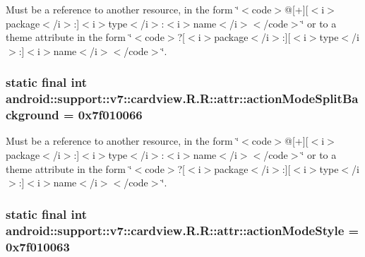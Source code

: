 Must be a reference to another resource, in the form \char`\"{}$<$code$>$@\mbox{[}+\mbox{]}\mbox{[}$<$i$>$package$<$/i$>$:\mbox{]}$<$i$>$type$<$/i$>$:$<$i$>$name$<$/i$>$$<$/code$>$\char`\"{} or to a theme attribute in the form \char`\"{}$<$code$>$?\mbox{[}$<$i$>$package$<$/i$>$:\mbox{]}\mbox{[}$<$i$>$type$<$/i$>$:\mbox{]}$<$i$>$name$<$/i$>$$<$/code$>$\char`\"{}. \hypertarget{classandroid_1_1support_1_1v7_1_1cardview_1_1_r_1_1attr_aa78e36ac55f75cf0a026cfb3b95a94f}{
\subsubsection[{actionModeSplitBackground}]{\setlength{\rightskip}{0pt plus 5cm}static final int android::support::v7::cardview.R.R::attr::actionModeSplitBackground = 0x7f010066}}
\label{classandroid_1_1support_1_1v7_1_1cardview_1_1_r_1_1attr_aa78e36ac55f75cf0a026cfb3b95a94f}


Must be a reference to another resource, in the form \char`\"{}$<$code$>$@\mbox{[}+\mbox{]}\mbox{[}$<$i$>$package$<$/i$>$:\mbox{]}$<$i$>$type$<$/i$>$:$<$i$>$name$<$/i$>$$<$/code$>$\char`\"{} or to a theme attribute in the form \char`\"{}$<$code$>$?\mbox{[}$<$i$>$package$<$/i$>$:\mbox{]}\mbox{[}$<$i$>$type$<$/i$>$:\mbox{]}$<$i$>$name$<$/i$>$$<$/code$>$\char`\"{}. \hypertarget{classandroid_1_1support_1_1v7_1_1cardview_1_1_r_1_1attr_df8ac56f2dc833d33efc682a380f3e4f}{
\subsubsection[{actionModeStyle}]{\setlength{\rightskip}{0pt plus 5cm}static final int android::support::v7::cardview.R.R::attr::actionModeStyle = 0x7f010063}}
\label{classandroid_1_1support_1_1v7_1_1cardview_1_1_r_1_1attr_df8ac56f2dc833d33efc682a380f3e4f}


